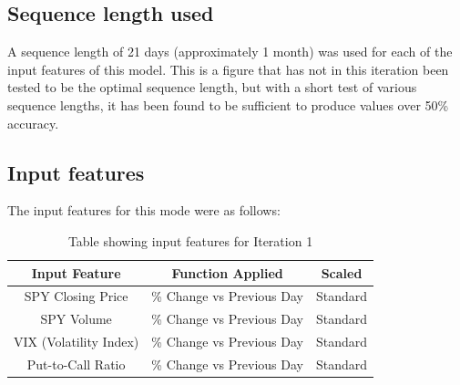 \subsection{Sequence length used}
A sequence length of 21 days (approximately 1 month) was used for each of the input features of this model.
This is a figure that has not in this iteration been tested to be the optimal sequence length, but with a short
test of various sequence lengths, it has been found to be sufficient to produce values over 50\% accuracy.
\subsection{Input features}
The input features for this mode were as follows:
\begin{table}[h]
    \centering
    \begin{tabular}{|c|c|c|}
        \hline
        Input Feature & Function Applied & Scaled \\
        \hline\hline
        SPY Closing Price & \% Change vs Previous Day& Standard \\
        SPY Volume & \% Change vs Previous Day& Standard \\
        VIX (Volatility Index) & \% Change vs Previous Day& Standard \\
        Put-to-Call Ratio & \% Change vs Previous Day& Standard \\
        \hline
    \end{tabular}
    \caption{Table showing input features for Iteration 1}
    \label{tab:iteration1_input_features}
\end{table}
\FloatBarrier